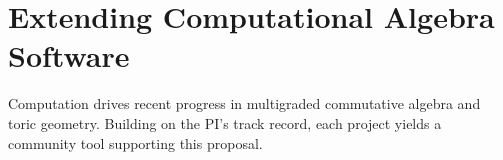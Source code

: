 \documentclass[11pt,reqno]{amsart}
\newtheorem{question}[lemma]{Question}
\theoremstyle{remark}
\newcommand{\Cox}{\operatorname{Cox}}
\newcommand{\dd}{\mathbf{d}}
\newcommand{\zero}{\mathbf{0}}
\newcommand{\ZZ}{\mathbb{Z}}
\newcommand{\cE}{\mathcal{E}}
\newcommand{\cF}{\mathcal{F}}
\newcommand{\cM}{\mathcal{M}}
\newcommand{\cO}{\mathcal{O}}
\begin{document}
%
%
%
%
%
%
%

\section{Extending Computational Algebra Software}\label{sec:comp}
Computation drives recent progress in multigraded commutative algebra and toric geometry. Building on the PI's track record, each project yields a community tool supporting this proposal.
\end{document}
